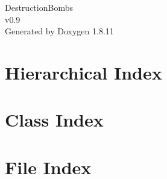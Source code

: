 \documentclass[twoside]{book}
\newcommand{\+}{\discretionary{\mbox{\scriptsize$\hookleftarrow$}}{}{}}
\newcommand{\clearemptydoublepage}{%
  \newpage{\pagestyle{empty}\cleardoublepage}%
}
\begin{document}
\hypersetup{pageanchor=false,
             bookmarksnumbered=true,
             pdfencoding=unicode
            }
\begin{titlepage}
\vspace*{7cm}
\begin{center}%
{\Large Destruction\+Bombs \\[1ex]\large v0.\+9 }\\
\vspace*{1cm}
{\large Generated by Doxygen 1.8.11}\\
\end{center}
\end{titlepage}
\clearemptydoublepage
\tableofcontents
\clearemptydoublepage
{}
\hypersetup{pageanchor=true}

\chapter{Hierarchical Index}

\chapter{Class Index}

\chapter{File Index}

\end{document}
